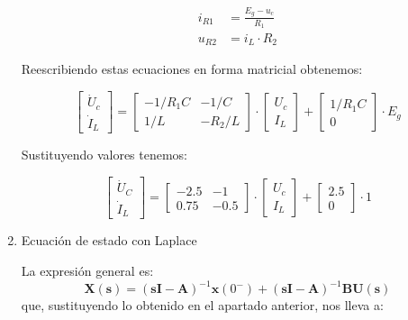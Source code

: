 \documentclass[12pt]{article}
\newcommand{\laplace}[1]{\mathbf{#1}(\mathbf{s})}
\newcommand{\slp}{\mathbf{s}}
\begin{document}
\begin{enumerate}
  \begin{align*}
    i_{R1} &= \frac{E_g - u_c}{R_1}\\
    u_{R2} &= i_L \cdot R_2
  \end{align*}

  Reescribiendo estas ecuaciones en forma matricial obtenemos:

  \[
    \left[
      \begin{array}{c}
        \dot{U}_c\\
        \dot{I}_L
      \end{array}
    \right] =
    \left[
      \begin{array}{cc}
        -1/R_1C & -1/C\\
        1/L & -R_2/L
      \end{array}
    \right] \cdot
    \left[
      \begin{array}{c}
        U_c\\
        I_L
      \end{array}
    \right] +
    \left[
      \begin{array}{c}
        1/R_1C\\
        0
      \end{array}
    \right] \cdot E_g
  \]


Sustituyendo valores tenemos:

  \[
    \left[
      \begin{array}{c}
        \dot{U}_C\\
        \dot{I}_L
      \end{array}
    \right] =
    \left[
      \begin{array}{cc}
        -2.5 & -1\\
        0.75 & -0.5
      \end{array}
    \right] \cdot
    \left[
      \begin{array}{c}
        U_c\\
        I_L
      \end{array}
    \right] +
    \left[
      \begin{array}{c}
        2.5\\
        0
      \end{array}
    \right] \cdot 1
  \]


\item Ecuación de estado con Laplace

  La expresión general es:
  \[
    \laplace{X} = \left(\slp \mathbf{I} - \mathbf{A} \right)^{-1} \mathbf{x}(0^-) + \left(\slp \mathbf{I} - \mathbf{A} \right)^{-1} \mathbf{B}\laplace{U}
  \]
  que, sustituyendo lo obtenido en el apartado anterior, nos lleva a:


\end{enumerate}
\end{document}
